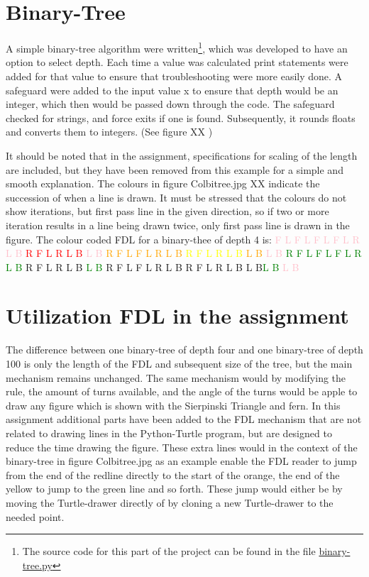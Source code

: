\documentclass[titlepage]{article}
\newcommand{\pink}{\textcolor{pink}}
\newcommand{\red}{\textcolor{red}}
\newcommand{\orange}{\textcolor{orange}}
\newcommand{\yellow}{\textcolor{yellow}}
\newcommand{\green}{\textcolor{green}}
\newcommand{\lgreen}{\textcolor{lgreen}}
\newcommand{\dblue}{\textcolor{dblue}}
\newcommand{\lblue}{\textcolor{lblue}}
\begin{document}
\section{Binary-Tree}
A simple binary-tree algorithm were written\footnote{The source code for this part of the project can be found in the file \href{https://github.com/ErikAndersen81/DM550-FractalProject/blob/master/Working_binary_tree.py}{binary-tree.py}}, which was developed to have an option to select depth. Each time a value was calculated print statements were added for that value to ensure that troubleshooting were more easily done.  A safeguard were added to the input value x to ensure that depth would be an integer, which then would be passed down through the code. The safeguard checked for strings, and force exits if one is found. Subsequently, it rounds floats and converts them to integers. (See figure XX )

It should be noted that in the assignment, specifications for scaling of the length are included, but they have been removed from this example for a simple and smooth explanation. The colours in figure Colbitree.jpg XX indicate the succession of when a line is drawn. It must be stressed that the colours do not show iterations, but first pass line in the given direction, so if two or more iteration results in a line being drawn twice, only first pass line is drawn in the figure. 
The colour coded FDL for a binary-thee of depth 4 is:
\pink{F L F L F L F L R L B} \red{R F L R L B} \pink{L B} \orange{R F L F L R L B} \yellow{R F L R L B} \orange{L B} \pink{L B} \green{R F L F L F L R L B} \lgreen{R F L R L B} \green{L B} \dblue{R F L F L R L B} \lblue{R F L R L B} \dblue{L B}\green{L B} \pink{L B}

\section{Utilization FDL in the assignment}
The difference between one binary-tree of depth four and one binary-tree of depth 100 is only the length of the FDL and subsequent size of the tree, but the main mechanism remains unchanged.  The same mechanism would by modifying the rule, the amount of turns available, and the angle of the turns would be apple to draw any figure which is shown with the Sierpinski Triangle and fern.  In this assignment additional parts have been added to the FDL mechanism that are not related to drawing lines in the Python-Turtle program, but are designed to reduce the time drawing the figure. These extra lines would in the context of the binary-tree in figure Colbitree.jpg  as an example enable the FDL reader to jump from the end of the redline directly to the start of the orange, the end of the yellow to jump to the green line and so forth. These jump would either be by moving the Turtle-drawer directly of by cloning a new Turtle-drawer to the needed point. 
\end{document}
